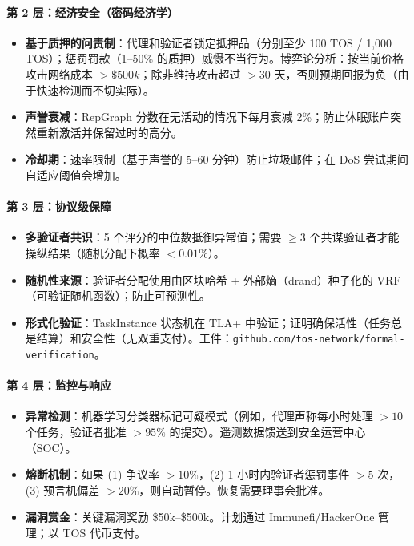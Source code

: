 \documentclass[11pt]{article}
\begin{document}
\paragraph{第 2 层：经济安全（密码经济学）}
\begin{itemize}[noitemsep]
  \item \textbf{基于质押的问责制}：代理和验证者锁定抵押品（分别至少 100 TOS / 1,000 TOS）；惩罚罚款（1--50\% 的质押）威慑不当行为。博弈论分析：按当前价格攻击网络成本 $>\$500k$；除非维持攻击超过 $>30$ 天，否则预期回报为负（由于快速检测而不切实际）。
  \item \textbf{声誉衰减}：RepGraph 分数在无活动的情况下每月衰减 2\%；防止休眠账户突然重新激活并保留过时的高分。
  \item \textbf{冷却期}：速率限制（基于声誉的 5--60 分钟）防止垃圾邮件；在 DoS 尝试期间自适应阈值会增加。
\end{itemize}

\paragraph{第 3 层：协议级保障}
\begin{itemize}[noitemsep]
  \item \textbf{多验证者共识}：5 个评分的中位数抵御异常值；需要 $\geq3$ 个共谋验证者才能操纵结果（随机分配下概率 $<0.01\%$）。
  \item \textbf{随机性来源}：验证者分配使用由区块哈希 + 外部熵（drand）种子化的 VRF（可验证随机函数）；防止可预测性。
  \item \textbf{形式化验证}：TaskInstance 状态机在 TLA+ 中验证；证明确保活性（任务总是结算）和安全性（无双重支付）。工件：\texttt{github.com/tos-network/formal-verification}。
\end{itemize}

\paragraph{第 4 层：监控与响应}
\begin{itemize}[noitemsep]
  \item \textbf{异常检测}：机器学习分类器标记可疑模式（例如，代理声称每小时处理 $>10$ 个任务，验证者批准 $>95\%$ 的提交）。遥测数据馈送到安全运营中心（SOC）。
  \item \textbf{熔断机制}：如果 (1) 争议率 $>10\%$，(2) 1 小时内验证者惩罚事件 $>5$ 次，(3) 预言机偏差 $>20\%$，则自动暂停。恢复需要理事会批准。
  \item \textbf{漏洞赏金}：关键漏洞奖励 \$50k--\$500k。计划通过 Immunefi/HackerOne 管理；以 TOS 代币支付。
\end{itemize}
\end{document}
